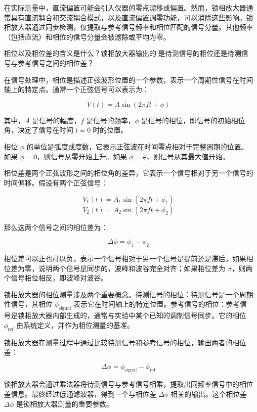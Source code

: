\documentclass[dvipsnames, svgnames,a4paper,11pt]{article}
\begin{document}
在实际测量中，直流偏置可能会引入仪器的零点漂移或偏置。然而，锁相放大器通常具有直流耦合和交流耦合模式，以及直流偏置调零功能，可以消除这些影响。锁相放大器通过同步检测，仅提取与参考信号频率和相位匹配的信号分量。其他频率（包括直流）和相位的信号分量会被滤除或平均为零。




\begin{question}
	相位以及相位差的含义是什么？锁相放大器输出的是待测信号的相位还是待测信号与参考信号之间的相位差？
\end{question}

在信号处理中，相位是描述正弦波形位置的一个参数，表示一个周期性信号在时间轴上的特定点。通常一个正弦信号可以表示为：

\[
V(t) = A \sin(2\pi f t + \phi)
\]

其中，\( A \) 是信号的幅度，\( f \) 是信号的频率，\( \phi \) 是信号的相位，即信号的初始相位角，决定了信号在时间 \( t = 0 \) 时的位置。

相位 \( \phi \) 的单位是弧度或度数，它表示正弦波在时间零点相对于完整周期的位置。如果 \( \phi = 0 \)，则信号从零开始上升。如果 \( \phi = \frac{\pi}{2} \)，则信号从其最大值开始。

相位差是两个正弦波形之间的相位角的差异，它表示一个信号相对于另一个信号的时间偏移。假设有两个正弦信号：

\[
V_1(t) = A_1 \sin(2\pi f t + \phi_1)
\]
\[
V_2(t) = A_2 \sin(2\pi f t + \phi_2)
\]

那么这两个信号之间的相位差为：

\[
\Delta \phi = \phi_1 - \phi_2
\]

相位差可以正也可以负，表示一个信号相对于另一个信号是提前还是滞后。如果相位差为零，说明两个信号是同步的，波峰和波谷完全对齐；如果相位差为 \( \pi \)，则两个信号相位相反，即波峰对波谷。

锁相放大器的相位测量涉及两个重要概念。待测信号的相位：待测信号是一个周期性信号，其相位 \( \phi_{\text{signal}} \) 表示它在时间轴上的特定位置。参考信号的相位：参考信号是锁相放大器内部生成的，通常与实验中某个已知的调制信号同步。它的相位 \( \phi_{\text{ref}} \) 由系统定义，并作为相位测量的基准。

锁相放大器在测量过程中通过比较待测信号和参考信号的相位，输出两者的相位差：

\[
\Delta \phi = \phi_{\text{signal}} - \phi_{\text{ref}}
\]

锁相放大器会通过乘法器将待测信号与参考信号相乘，提取出同频率信号中的相位差信息。最终经过低通滤波器，得到一个与相位差 \( \Delta \phi \) 相关的输出。这个相位差 \( \Delta \phi \) 是锁相放大器测量的重要参数。
\end{document}
